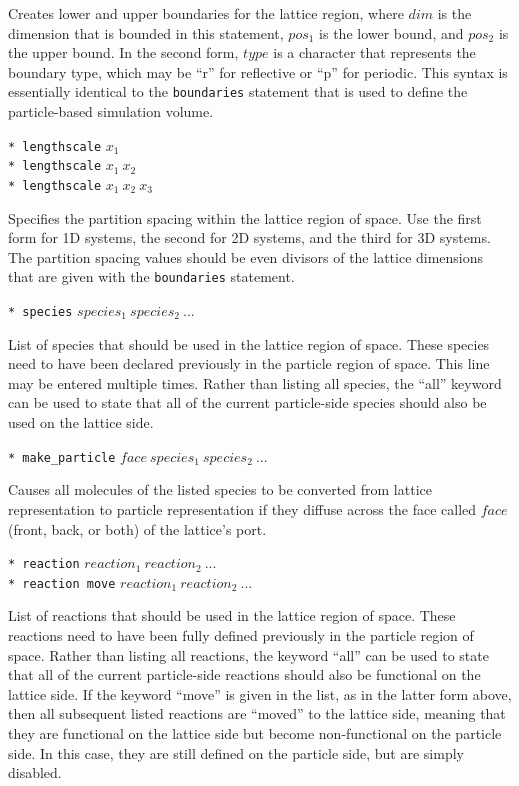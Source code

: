 \documentclass {book}
\newcommand {\ttt} {\texttt}
\begin{document}
\begin{description}
Creates lower and upper boundaries for the lattice region, where $dim$ is the dimension that is bounded in this statement, $pos_1$ is the lower bound, and $pos_2$ is the upper bound. In the second form, $type$ is a character that represents the boundary type, which may be ``r'' for reflective or ``p'' for periodic. This syntax is essentially identical to the \ttt{boundaries} statement that is used to define the particle-based simulation volume.

\item{\ttt{* lengthscale} $x_1$\\
\ttt{* lengthscale} $x_1\ x_2$\\
\ttt{* lengthscale} $x_1\ x_2\ x_3$}

Specifies the partition spacing within the lattice region of space. Use the first form for 1D systems, the second for 2D systems, and the third for 3D systems. The partition spacing values should be even divisors of the lattice dimensions that are given with the \ttt{boundaries} statement.

\item{\ttt{* species} $species_1\ species_2\ ...$}

List of species that should be used in the lattice region of space. These species need to have been declared previously in the particle region of space. This line may be entered multiple times. Rather than listing all species, the ``all'' keyword can be used to state that all of the current particle-side species should also be used on the lattice side.

\item{\ttt{* make\_particle} $face\ species_1\ species_2\ ...$}

Causes all molecules of the listed species to be converted from lattice representation to particle representation if they diffuse across the face called $face$ (front, back, or both) of the lattice's port.

\item{\ttt{* reaction} $reaction_1\ reaction_2\ ...$\\
\ttt{* reaction move} $reaction_1\ reaction_2\ ...$}

List of reactions that should be used in the lattice region of space. These reactions need to have been fully defined previously in the particle region of space. Rather than listing all reactions, the keyword ``all'' can be used to state that all of the current particle-side reactions should also be functional on the lattice side. If the keyword ``move'' is given in the list, as in the latter form above, then all subsequent listed reactions are ``moved'' to the lattice side, meaning that they are functional on the lattice side but become non-functional on the particle side. In this case, they are still defined on the particle side, but are simply disabled.


\end{description}
\end{document}
